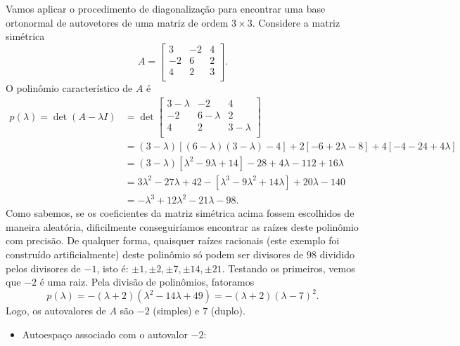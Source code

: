 \begin{ex}
	Vamos aplicar o procedimento de diagonalização para encontrar uma base ortonormal de autovetores de uma matriz de ordem $3 \times 3$. Considere a matriz simétrica
	\begin{equation}
	A =
	\begin{bmatrix}
	3 & -2 & 4 \\
	-2 & 6 & 2 \\
	4 & 2 & 3 \\
	\end{bmatrix}.
	\end{equation} O polinômio característico de $A$ é
          \begin{align*}
	p(\lambda) = \det (A - \lambda I ) & =
	\det
	\begin{bmatrix}
	3- \lambda & -2 & 4 \\
	-2 & 6- \lambda & 2 \\
	4 & 2 & 3- \lambda \\
	\end{bmatrix} \\
	& = (3-\lambda) \left[ (6 - \lambda)(3 - \lambda) - 4 \right] + 2 \left[ -6 + 2 \lambda - 8 \right]  + 4 \left[ - 4 - 24 + 4 \lambda \right]  \\
	& = (3-\lambda) \left[ \lambda^2 - 9 \lambda + 14 \right] -28 + 4 \lambda - 112 + 16 \lambda  \\
	& = 3\lambda^2 - 27 \lambda + 42  - \left[ \lambda^3 - 9 \lambda^2 + 14 \lambda \right] + 20 \lambda - 140  \\
	& = -\lambda^3 + 12 \lambda^2 - 21 \lambda - 98.
          \end{align*}
 Como sabemos, se os coeficientes da matriz simétrica acima fossem escolhidos de maneira aleatória, dificilmente conseguiríamos encontrar as raízes deste polinômio com precisão. De qualquer forma, quaisquer raízes racionais (este exemplo foi construído artificialmente) deste polinômio só podem ser divisores de $98$ dividido pelos divisores de $-1$, isto é: $\pm 1, \pm 2, \pm 7, \pm 14, \pm 21$. Testando os primeiros, vemos que $-2$ é uma raiz. Pela divisão de polinômios, fatoramos
	\begin{equation}
	p(\lambda) = -(\lambda + 2) (\lambda^2 - 14 \lambda + 49) = -(\lambda + 2)(\lambda - 7)^2.
	\end{equation} Logo, os autovalores de $A$ são $-2$ (simples) e $7$ (duplo).
	\begin{itemize}
		\item Autoespaço associado com o autovalor $-2$:
		\begin{equation}

\end{equation}
\end{itemize}
\end{ex}
